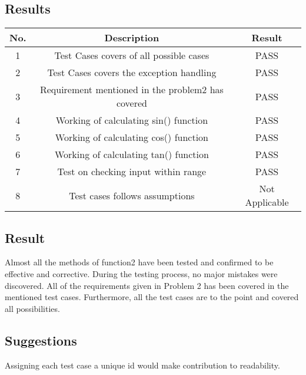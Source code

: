 \documentclass[a4paper,12pt]{article}
\begin{document}
    \subsection{Results}
    \begin{center}
    \begin{tabular}{||c c c||} 
     \hline
     No. & Description & Result \\ 
     \hline\hline
     1 & Test Cases covers of all possible cases & PASS \\ 
     \hline
     2 & Test Cases covers the exception handling & PASS \\
     \hline
     3 & Requirement mentioned in the problem2 has covered & PASS \\
     \hline
     4 & Working of calculating sin() function & PASS \\
     \hline
     
     \hline
     5 & Working of calculating cos() function & PASS \\
     \hline
     
     \hline
     6 & Working of calculating tan() function & PASS \\
     \hline
     7 & Test on checking input within range & PASS \\
     \hline
     8 & Test cases follows assumptions & Not Applicable \\
     \hline
    \end{tabular}
    \end{center}
    
    \subsection{Result}
    Almost all the methods of function2 have been tested and confirmed to be effective and corrective. During the testing process, no major  mistakes were discovered. All of the requirements given in Problem 2 has been covered in the mentioned test cases. Furthermore, all the test cases are to the point and covered all possibilities.
    
    \subsection{Suggestions}
    Assigning each test case a unique id would make contribution to readability.
    
\end{document}
